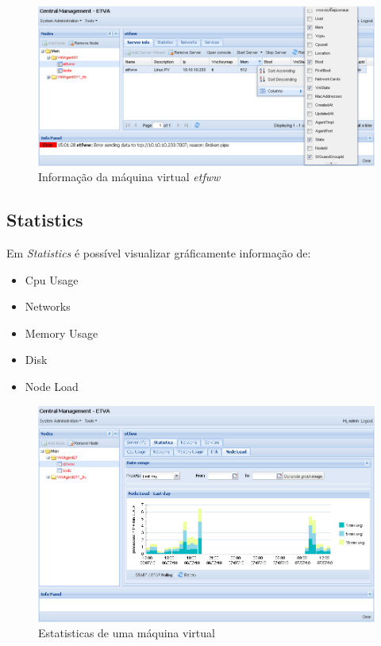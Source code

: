\begin{figure}[H]
	\begin{center}
	\includegraphics[scale=0.5]{screenshots/server_info.png}
	\caption{Informação da máquina virtual \emph{etfww}}
	\label{fig:server_info}
	\end{center}
\end{figure}

\subsection{Statistics}
Em \emph{Statistics} é possível visualizar gráficamente informação de:
\begin{itemize}
	\item Cpu Usage
	\item Networks
	\item Memory Usage
	\item Disk
	\item Node Load
\end{itemize}


\begin{figure}[H]
	\begin{center}
	\includegraphics[scale=0.5]{screenshots/server_stats_nodeLoad.png}
	\caption{Estatisticas de uma máquina virtual}
	\label{fig:server_stats_nodeLoad}
	\end{center}
\end{figure}


